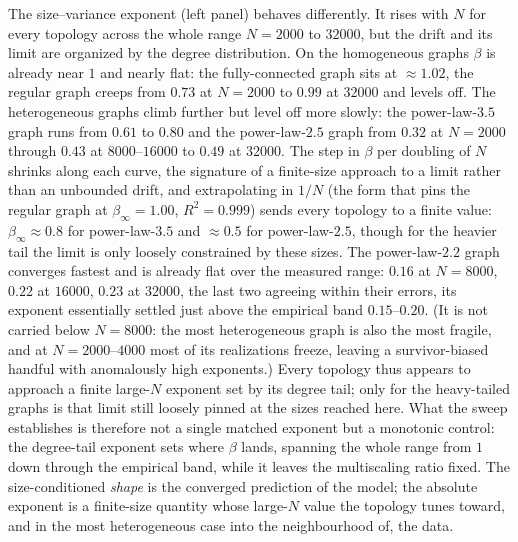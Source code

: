 The size--variance exponent (left panel) behaves differently. It rises with $N$ for
every topology across the whole range $N = 2000$ to $32000$, but the drift and its limit are
organized by the degree distribution. On the homogeneous graphs $\beta$ is already near $1$ and
nearly flat: the fully-connected graph sits at $\approx 1.02$, the regular graph creeps from
$0.73$ at $N = 2000$ to $0.99$ at $32000$ and levels off. The heterogeneous graphs climb further but level off more slowly:
the power-law-$3.5$ graph runs from $0.61$ to $0.80$ and the power-law-$2.5$ graph from $0.32$ at
$N = 2000$ through $0.43$ at $8000$--$16000$ to $0.49$ at $32000$. The step in $\beta$ per doubling
of $N$ shrinks along each curve, the signature of a finite-size approach to a limit rather than
an unbounded drift, and extrapolating in $1/N$ (the form that pins the regular graph at
$\beta_\infty = 1.00$, $R^2 = 0.999$) sends every topology to a finite value: $\beta_\infty
\approx 0.8$ for power-law-$3.5$ and $\approx 0.5$ for power-law-$2.5$, though for the heavier tail
the limit is only loosely constrained by these sizes. The power-law-$2.2$ graph converges
fastest and is already flat over the measured range: $0.16$ at $N = 8000$, $0.22$ at $16000$,
$0.23$ at $32000$, the last two agreeing within their errors, its exponent essentially settled
just above the empirical band $0.15$--$0.20$. (It is not carried below $N = 8000$: the most
heterogeneous graph is also the most fragile, and at $N = 2000$--$4000$ most of its realizations
freeze, leaving a survivor-biased handful with anomalously high exponents.) Every topology thus
appears to approach a finite large-$N$ exponent set by its degree tail; only for the heavy-tailed
graphs is that limit still loosely pinned at the sizes reached here. What the sweep establishes is
therefore not a single matched exponent but a monotonic control: the degree-tail exponent sets
where $\beta$ lands, spanning the whole range from $1$ down through the empirical band, while it
leaves the multiscaling ratio fixed. The size-conditioned \emph{shape} is the converged
prediction of the model; the absolute exponent is a finite-size quantity whose large-$N$ value
the topology tunes toward, and in the most heterogeneous case into the neighbourhood of, the
data.

